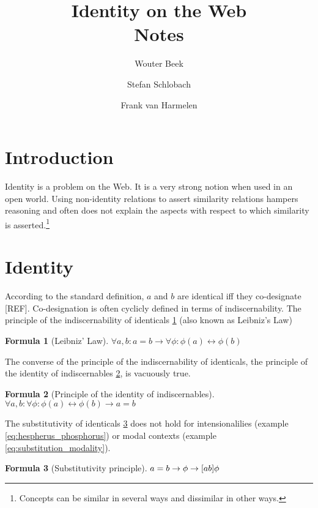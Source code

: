 \documentclass[11pt,a4paper,notitlepage,onecolumn,twoside]{article}
\title{Identity on the Web \\ Notes}
\author{Wouter Beek \and Stefan Schlobach \and Frank van Harmelen}
\newtheorem{formula}{Formula}
\begin{document}
\maketitle

\section{Introduction}

Identity is a problem on the Web. It is a very strong notion when used in an
open world. Using non-identity relations to assert similarity relations
hampers reasoning and often does not explain the aspects with respect to
which similarity is asserted.\footnote{Concepts can be similar in several
ways and dissimilar in other ways.}

\section{Identity}

According to the standard definition, $a$ and $b$ are identical
iff they co-designate [REF]. Co-designation is often cyclicly defined
in terms of indiscernability. The principle of the indiscernability of
identicals \ref{eq:leibniz_law} (also known as Leibniz's Law) 

\begin{formula}[Leibniz' Law]
\label{eq:leibniz_law}
$\forall a,b: a = b \rightarrow \forall \phi: \phi(a) \leftrightarrow \phi(b)$
\end{formula}

The converse of the principle of the indiscernability of identicals,
the principle of the identity of indiscernables
\ref{eq:principle_of_the_identity_of_indiscernables}, is vacuously true.

\begin{formula}[Principle of the identity of indiscernables]
\label{eq:principle_of_the_identity_of_indiscernables}
$\forall a,b: \forall \phi: \phi(a) \leftrightarrow \phi(b) \rightarrow a = b$
\end{formula}

The substitutivity of identicals \ref{eq:substitutivity_principle}
does not hold for intensionalilies (example \ref{eq:hespherus_phosphorus})
or modal contexts (example \ref{eq:substitution_modality}).

\begin{formula}[Substitutivity principle]
\label{eq:substitutivity_principle}
$a = b \rightarrow \phi \rightarrow [a \\ b]\phi$
\end{formula}
\end{document}
